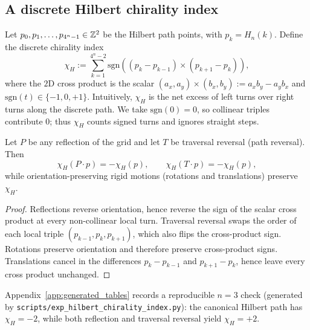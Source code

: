 \subsection{A discrete Hilbert chirality index}
\label{subsec:hilbert_chi}

Let $p_0,p_1,\dots,p_{4^n-1}\in\mathbb{Z}^2$ be the Hilbert path points, with $p_k=H_n(k)$.
Define the discrete chirality index
\begin{equation}\label{eq:hilbert_chi_def}
\chi_H:=\sum_{k=1}^{4^n-2}\mathrm{sgn}\!\left( (p_k-p_{k-1})\times (p_{k+1}-p_k)\right),
\end{equation}
where the $2$D cross product is the scalar $ (a_x,a_y)\times(b_x,b_y):=a_x b_y-a_y b_x$ and $\mathrm{sgn}(t)\in\{-1,0,+1\}$.
Intuitively, $\chi_H$ is the net excess of left turns over right turns along the discrete path.
We take $\mathrm{sgn}(0)=0$, so collinear triples contribute $0$; thus $\chi_H$ counts signed turns and ignores straight steps.

\begin{proposition}\label{prop:chi_flip}
Let $P$ be any reflection of the grid and let $T$ be traversal reversal (path reversal).
Then
\[
\chi_H(P\cdot p)=-\chi_H(p),\qquad
\chi_H(T\cdot p)=-\chi_H(p),
\]
while orientation-preserving rigid motions (rotations and translations) preserve $\chi_H$.
\end{proposition}
\begin{proof}
Reflections reverse orientation, hence reverse the sign of the scalar cross product at every non-collinear local turn.
Traversal reversal swaps the order of each local triple $(p_{k-1},p_k,p_{k+1})$, which also flips the cross-product sign.
Rotations preserve orientation and therefore preserve cross-product signs.
Translations cancel in the differences $p_k-p_{k-1}$ and $p_{k+1}-p_k$, hence leave every cross product unchanged.
\end{proof}

Appendix~\ref{app:generated_tables} records a reproducible $n=3$ check (generated by \texttt{scripts/exp\_hilbert\_chirality\_index.py}): the canonical Hilbert path has $\chi_H=-2$, while both reflection and traversal reversal yield $\chi_H=+2$.


